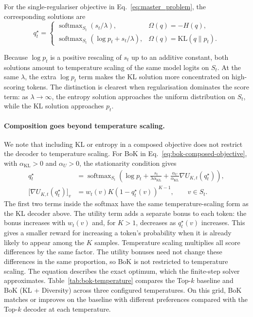 \documentclass{article} %
\begin{document}
For the single-regulariser objective in Eq.~\ref{eq:master_problem}, the corresponding solutions are
\begin{equation}
    q_t^\star=
    \begin{cases}
        \operatorname{softmax}_{S_t}(s_t/\lambda),
        & \Omega(q)=-H(q),\\
        \operatorname{softmax}_{S_t}(\log p_t+s_t/\lambda),
        & \Omega(q)=\mathrm{KL}(q\|p_t).
    \end{cases}
\end{equation}

Because $\log p_t$ is a positive rescaling of $s_t$ up to an additive constant, both solutions amount to temperature scaling of the same model logits on $S_t$.
At the same $\lambda$, the extra $\log p_t$ term makes the KL solution more concentrated on high-scoring tokens.
The distinction is clearest when regularisation dominates the score term: as $\lambda\to\infty$, the entropy solution approaches the uniform distribution on $S_t$, while the KL solution approaches $p_t$. 

\paragraph{Composition goes beyond temperature scaling.} We note that including KL or entropy in a composed objective does not restrict the decoder to temperature scaling.
For BoK in Eq.~\ref{eq:bok-composed-objective}, with $\alpha_{\mathrm{KL}}>0$ and $\alpha_U>0$, the stationarity condition gives
\begin{equation}
\begin{aligned}
    q_t^\star
    &=\operatorname{softmax}_{S_t}\left(
        \log p_t+\frac{s_t}{\lambda\alpha_{\mathrm{KL}}}
        +\frac{\alpha_U}{\alpha_{\mathrm{KL}}}\nabla U_{K,t}(q_t^\star)
      \right),\\
    \big[\nabla U_{K,t}(q_t^\star)\big]_v
    &=w_t(v)K(1-q_t^\star(v))^{K-1},\qquad v\in S_t.
\end{aligned}
\end{equation}
The first two terms inside the softmax have the same temperature-scaling form as the KL decoder above.
The utility term adds a separate bonus to each token: the bonus increases with $w_t(v)$ and, for $K>1$, decreases as $q_t^\star(v)$ increases.
This gives a smaller reward for increasing a token's probability when it is already likely to appear among the $K$ samples.
Temperature scaling multiplies all score differences by the same factor.
The utility bonuses need not change these differences in the same proportion, so BoK is not restricted to temperature scaling.
The equation describes the exact optimum, which the finite-step solver approximates.
Table~\ref{tab:bok-temperature} compares the Top-$k$ baseline and BoK (KL + Diversity) across three configured temperatures.
On this grid, BoK matches or improves on the baseline with different preferences compared with the Top-$k$ decoder at each temperature.
\end{document}
